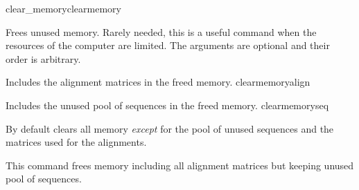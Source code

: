 \begin{command}{clear\_memory}{clearmemory}

    
    \begin{poydescription}
        Frees unused memory. Rarely needed, this is a useful command when the
        resources of the computer are limited. The arguments are optional and
        their order is arbitrary.
    \end{poydescription}
    
    \begin{arguments}
            {Includes the alignment matrices in the freed memory.} 
            {clearmemoryalign}

            {Includes the unused pool of sequences in the freed memory.}
            {clearmemoryseq}
    \end{arguments}
    
    \poydefaults{}
        {By default \poy clears all memory \emph{except} for the pool of unused
        sequences and the matrices used for the alignments.}
    
    \begin{poyexamples}
            {This command frees memory including all alignment matrices but keeping
            unused pool of sequences.}
    \end{poyexamples}

    \begin{poyalso}
    \end{poyalso}
    
\end{command}



   
